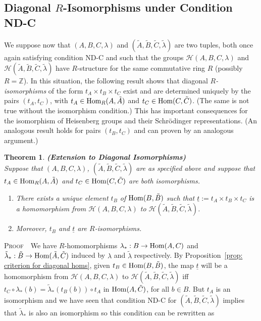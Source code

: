 \documentclass[12pt]{article}
\newtheorem{thm}{Theorem}[section]
\newcommand{\bbZ}{\ensuremath{\mathbb{Z}}}
\newcommand{\bPf}{\noindent \textsc{Proof\ }}
\newcommand{\cH}{\ensuremath{\mathcal{H}}}
\newcommand{\Hom}{{\rm Hom}}
\renewcommand{\t}[1]{\tilde{#1}}
\newcommand{\Hei}[4]{\cH({#1},{#2},{#3},{#4})}
\newcommand{\HeiStan}{\Hei{A}{B}{C}{\lambda}}
\begin{document}
\subsection{Diagonal $R$-Isomorphisms under Condition ND-C}
We suppose now that $(A,B,C,\lambda)$ and 
$({\t A},{\t B},{\t C},{\t \lambda})$ are two tuples, both once again satisfying condition ND-C and such that 
the groups $\HeiStan$  and $\cH({\t A},{\t B},{\t C},{\t \lambda})$ have $R$-structure for the same commutative ring $R$ (possibly $R=\bbZ$). In this situation, the following result shows that diagonal \textit{$R$-isomorphisms} of the form $t_A \times t_B \times t_C$ exist and are determined uniquely by the pairs $(t_A,t_C)$, with $t_A\in\Hom_R(A,\t A)$ and $t_C\in\Hom(C,\t C)$. (The same is not true without the isomorphism condition.) This has important consequences for the isomorphism of Heisenberg groups and  
their Schr\"odinger representations. (An analogous result  holds for pairs $(t_B,t_C)$ and can proven by an analogous argument.)
\begin{thm}{\bf (Extension to Diagonal Isomorphisms)}\label{prop:Extension to Diagonal Isomorphisms}\\
	Suppose that $(A,B,C,\lambda)$, 
	$({\t A},{\t B},{\t C},{\t \lambda})$  are as specified above and suppose that $t_A\in\Hom_R(A,\t A)$ and $t_C\in\Hom(C,\t C)$ are both \emph{isomorphisms}. 
	\begin{enumerate}
		\item\label{part:Extension to Diagonal Isomorphisms1} There exists a unique element 
		$t_B$ of $\Hom(B,\t B)$ such that $\underline{t}:=t_A\times t_B\times t_C$ is a homomorphism from $\HeiStan$  to $\cH({\t A},{\t B},{\t C},{\t \lambda})$.
		\item\label{part:Extension to Diagonal Isomorphisms2} Moreover, $t_B$ and $\underline{t}$ are $R$-isomorphisms.
	\end{enumerate} 
\end{thm}
\bPf\ We have $R$-homomorphisms 
$
\lambda_\ast: B \rightarrow \Hom(A,C)
$ and $
\t \lambda_\ast: \t B \rightarrow \Hom(\t A,\t C)
$
induced by $\lambda$ and $\t \lambda$ respectively. 
By Proposition~\ref{prop: criterion for diagonal homs}, given $t_B\in\Hom(B,\t B)$, the map $\underline{t}$ will be a homomorphism from $\HeiStan$  to $\cH({\t A},{\t B},{\t C},{\t \lambda})$ iff 
$
t_C\circ\lambda_\ast(b)=
{\t \lambda}_\ast(t_B(b))\circ 
t_A
$
in $\Hom(A,\t C)$, for all $b\in B$. But $t_A$ is an isomorphism and we have seen that condition ND-C for 
$({\t A},{\t B},{\t C},{\t \lambda})$ implies that ${\t \lambda}_\ast$ is also an isomorphism so this condition can be rewritten as 
\end{document}
